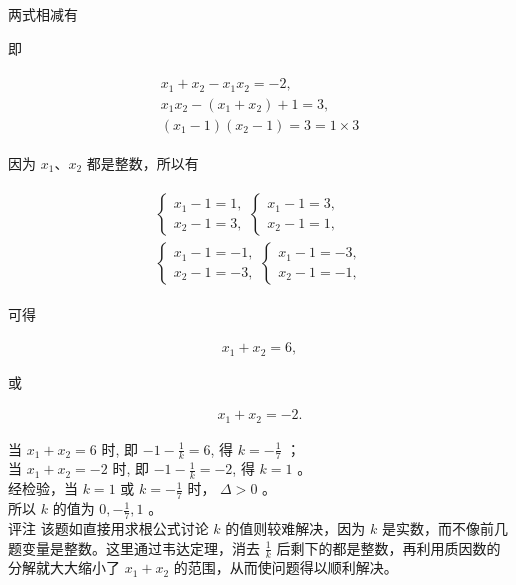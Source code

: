 \documentclass[10pt]{article}
\begin{document}
两式相减有

即

\begin{align*}
\begin{gathered}
x_{1}+x_{2}-x_{1} x_{2}=-2, \\
x_{1} x_{2}-\left(x_{1}+x_{2}\right)+1=3, \\
\left(x_{1}-1\right)\left(x_{2}-1\right)=3=1 \times 3
\end{gathered}
\end{align*}

因为 $x_{1} 、 x_{2}$ 都是整数，所以有

\begin{align*}
\begin{gathered}
\left\{\begin{array} { l } 
{ x _ { 1 } - 1 = 1 , } \\
{ x _ { 2 } - 1 = 3 , }
\end{array} \left\{\begin{array}{l}
x_{1}-1=3, \\
x_{2}-1=1,
\end{array}\right.\right. \\
\left\{\begin{array} { l } 
{ x _ { 1 } - 1 = - 1 , } \\
{ x _ { 2 } - 1 = - 3 , }
\end{array} \left\{\begin{array}{l}
x_{1}-1=-3, \\
x_{2}-1=-1,
\end{array}\right.\right.
\end{gathered}
\end{align*}

可得

\begin{align*}
x_{1}+x_{2}=6,
\end{align*}

或

\begin{align*}
x_{1}+x_{2}=-2 .
\end{align*}

当 $x_{1}+x_{2}=6$ 时, 即 $-1-\frac{1}{k}=6$, 得 $k=-\frac{1}{7}$ ；\\
当 $x_{1}+x_{2}=-2$ 时, 即 $-1-\frac{1}{k}=-2$, 得 $k=1$ 。\\
经检验，当 $k=1$ 或 $k=-\frac{1}{7}$ 时， $\Delta>0$ 。\\
所以 $k$ 的值为 $0,-\frac{1}{7}, 1$ 。\\
评注 该题如直接用求根公式讨论 $k$ 的值则较难解决，因为 $k$ 是实数，而不像前几题变量是整数。这里通过韦达定理，消去 $\frac{1}{k}$ 后剩下的都是整数，再利用质因数的分解就大大缩小了 $x_{1}+x_{2}$ 的范围，从而使问题得以顺利解决。
\end{document}
